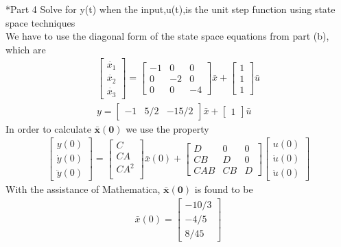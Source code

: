 \documentclass[paper=a4, fontsize=11pt]{scrartcl} %
\numberwithin{equation}{section} %
\numberwithin{figure}{section} %
\numberwithin{table}{section} %
\begin{document}
\begin{section}*{Part 4}
Solve for y(t) when the input,u(t),is the unit step function using state space techniques\\
We have to use the diagonal form of the state space equations from part (b), which are
\begin{align*}
\begin{bmatrix}\dot{x_1}\\\dot{x_2}\\\dot{x_3}\end{bmatrix}=\begin{bmatrix}-1 & 0 & 0\\0 & -2 & 0\\0 & 0 & -4\end{bmatrix}\bar{x}+\begin{bmatrix}1\\1\\1\end{bmatrix}\bar{u}\\
y=\begin{bmatrix}
-1 & 5/2 & -15/2 \end{bmatrix}\bar{x} + \begin{bmatrix}1\end{bmatrix}\bar{u}
\end{align*}
In order to calculate $\boldsymbol{\bar{x}(0)}$ we use the property 
\begin{align*}
\begin{bmatrix}y(0)\\\dot{y}(0)\\\ddot{y}(0)\end{bmatrix}=\begin{bmatrix}C \\ CA \\ CA^2\\\end{bmatrix}\bar{x}(0)+\begin{bmatrix}D & 0 & 0 \\CB & D & 0\\ CAB & CB & D\end{bmatrix}\begin{bmatrix}u(0)\\\dot{u}(0)\\\ddot{u}(0)\end{bmatrix}
\end{align*}
With the assistance of Mathematica, $\boldsymbol{\bar{x}(0)}$ is found to be
\begin{align}
\bar{x}(0)=\begin{bmatrix}-10/3\\-4/5\\8/45\end{bmatrix}

\end{align}
\end{section}
\end{document}
